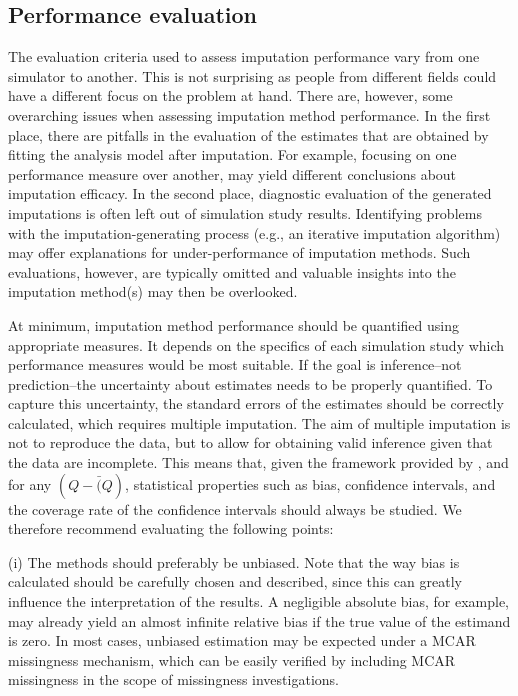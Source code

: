 \documentclass[bimj,fleqn]{w-art}
\begin{document}
\subsection{Performance evaluation}
The evaluation criteria used to assess imputation performance vary from one simulator to another. This is not surprising as people from different fields could have a different focus on the problem at hand. There are, however, some overarching issues when assessing imputation method performance. In the first place, there are pitfalls in the evaluation of the estimates that are obtained by fitting the analysis model after imputation. For example, focusing on one performance measure over another, may yield different conclusions about imputation efficacy. In the second place, diagnostic evaluation of the generated imputations is often left out of simulation study results. Identifying problems with the imputation-generating process (e.g., an iterative imputation algorithm) may offer explanations for under-performance of imputation methods. Such evaluations, however, are typically omitted and valuable insights into the imputation method(s) may then be overlooked. 

At minimum, imputation method performance should be quantified using appropriate measures. It depends on the specifics of each simulation study which performance measures would be most suitable. If the goal is inference--not prediction--the uncertainty about estimates needs to be properly quantified. To capture this uncertainty, the standard errors of the estimates should be correctly calculated, which requires multiple imputation. The aim of multiple imputation is not to reproduce the data, but to allow for obtaining valid inference given that the data are incomplete. This means that, given the framework provided by \citet{rubi87}, and for any $(Q-\bar(Q)$, statistical properties such as bias, confidence intervals, and the coverage rate of the confidence intervals should always be studied. We therefore recommend evaluating the following points:

(i) The methods should preferably be unbiased. Note that the way bias is calculated should be carefully chosen and described, since this can greatly influence the interpretation of the results. A negligible absolute bias, for example, may already yield an almost infinite relative bias if the true value of the estimand is zero. In most cases, unbiased estimation may be expected under a MCAR missingness mechanism, which can be easily verified by including MCAR missingness in the scope of missingness investigations.
\end{document}
